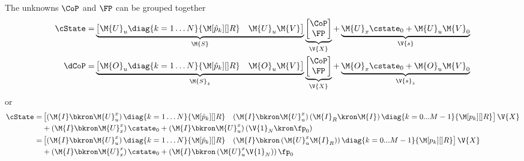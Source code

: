 The unknowns $\CoP$ and $\FP$ can be grouped together
%
\begin{align}
    \cState
    =&
    \underbrace{
    \begin{bmatrix}
        \M{U}_u \diag{k = 1 \dots N}{\M[\hat{p}_k][]{R}}   &   \M{U}_u \M{V} \\
    \end{bmatrix}
    }_{\M{S}}
    \underbrace{
    \begin{bmatrix}
        \CoP\\
        \FP\\
    \end{bmatrix}
    }_{\V{X}}
    +
    \underbrace{
    \M{U}_x \cstate_0
    +
    \M{U}_u \M{V}_0
    }_{\V{s}}\\
%
    \dCoP
    =&
    \underbrace{
    \begin{bmatrix}
        \M{O}_u \diag{k = 1 \dots N}{\M[\hat{p}_k][]{R}}   &   \M{O}_u \M{V} \\
    \end{bmatrix}
    }_{\M{S}_{\dot{z}}}
    \underbrace{
    \begin{bmatrix}
        \CoP\\
        \FP\\
    \end{bmatrix}
    }_{\V{X}}
    +
    \underbrace{
    \M{O}_x \cstate_0
    +
    \M{O}_u \M{V}_0
    }_{\V{s}_{\dot{z}}}\\
\end{align}
%
or
%
\begin{align}
    \cState
    =&
    \begin{bmatrix}
        \left(\M{I} \bkron \M{U}_u^x \right) \diag{k = 1 \dots N}{\M[\hat{p}_k][]{R}}
        &
        \left(\M{I} \bkron \M{U}_u^x \right)
        \left(
            \M{I}_R \kron \M{I}
        \right)
        \diag{k = 0...M-1}{ \M[p_{k}][]{R} }\\
    \end{bmatrix}
    \V{X}
    \\
    &
    +
    \left(\M{I} \bkron \M{U}_x^x \right)
    \cstate_0
    +
    \left(\M{I} \bkron \M{U}_u^x \right)
    \left(\V{1}_N \kron \fp_0 \right)
    \\
    =&
    \begin{bmatrix}
        \left(\M{I} \bkron \M{U}_u^x \right) \diag{k = 1 \dots N}{\M[\hat{p}_k][]{R}}
        &
        \left(
            \M{I}
            \bkron
            \left(
                \M{U}_u^x
                \M{I}_R
            \right)
        \right)
        \diag{k = 0...M-1}{ \M[p_{k}][]{R} }\\
    \end{bmatrix}
    \V{X}
    \\
    &
    +
    \left(\M{I} \bkron \M{U}_x^x \right)
    \cstate_0
    +
    \left(
        \M{I}
        \bkron
        \left(
            \M{U}_u^x
            \V{1}_N
        \right)
    \right)
    \fp_0
    \\
\end{align}
